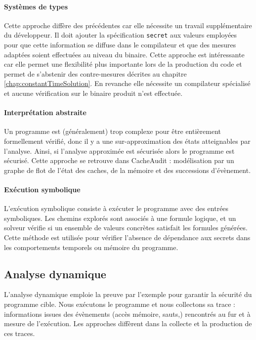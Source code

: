 \paragraph{Systèmes de types} Cette approche diffère des précédentes car elle nécessite un travail supplémentaire du développeur. Il doit ajouter la spécification \texttt{secret} aux valeurs employées pour que cette information se diffuse dans le compilateur et que des mesures adaptées soient effectuées au niveau du binaire. Cette approche est intéressante car elle permet une flexibilité plus importante lors de la production du code et permet de s'abstenir des contre-mesures décrites au chapitre \ref{chap:constantTimeSolution}. En revanche elle nécessite un compilateur spécialisé et aucune vérification sur le binaire produit n'est effectuée. 

\paragraph{Interprétation abstraite} Un programme est (généralement) trop complexe pour être entièrement formellement vérifié, donc il y a une sur-approximation des états atteignables par l'analyse. Ainsi, si l'analyse approximée est sécurisée alors le programme est sécurisé. Cette approche se retrouve dans CacheAudit \cite{CacheAudit} : modélisation par un graphe de flot de l'état des caches, de la mémoire et des successions d'évènement.

\paragraph{Exécution symbolique} L'exécution symbolique consiste à exécuter le programme avec des entrées symboliques. Les chemins explorés sont associés à une formule logique, et un solveur vérifie si un ensemble de valeurs concrètes satisfait les formules générées. Cette méthode est utilisée pour vérifier l'absence de dépendance aux secrets dans les comportements temporels ou mémoire du programme.

\subsection*{Analyse dynamique}

L'analyse dynamique emploie la preuve par l'exemple pour garantir la sécurité du programme cible. Nous exécutons le programme et nous collectons sa trace : informations issues des évènements (accès mémoire, sauts,\etc) rencontrés au fur et à mesure de l'exécution. Les approches diffèrent dans la collecte et la production de ces traces.

